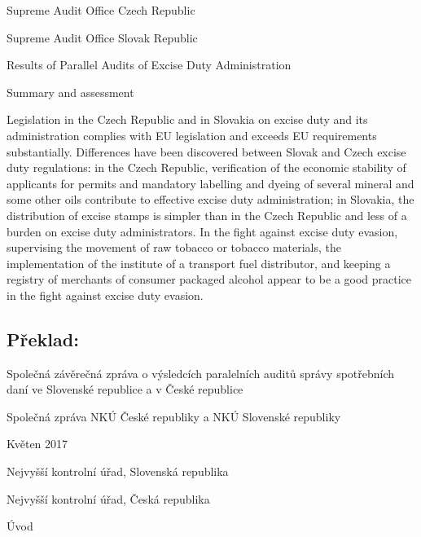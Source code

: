 \documentclass[10pt]{article}
\begin{document}
Supreme Audit Office Czech Republic



Supreme Audit Office Slovak Republic



Results of Parallel Audits of Excise Duty Administration



Summary and assessment

Legislation in the Czech Republic and in Slovakia on excise duty and its administration complies with EU legislation and exceeds EU requirements substantially.
Differences have been discovered between Slovak and Czech excise duty regulations: in the Czech Republic, verification of the economic stability of applicants for permits and mandatory labelling and dyeing of several mineral and some other oils contribute to effective excise duty administration; in Slovakia, the distribution of excise stamps is simpler than in the Czech Republic and less of a burden on excise duty administrators.
In the fight against excise duty evasion, supervising the movement of raw tobacco or tobacco materials, the implementation of the institute of a transport fuel distributor, and keeping a registry of merchants of consumer packaged alcohol appear to be a good practice in the fight against excise duty evasion.


\pagebreak

\subsection*{Překlad:}



Společná závěrečná zpráva o výsledcích paralelních auditů správy spotřebních daní ve Slovenské republice a v České republice



Společná zpráva NKÚ České republiky a NKÚ Slovenské republiky



Květen 2017



Nejvyšší kontrolní úřad, Slovenská republika



Nejvyšší kontrolní úřad, Česká republika



Úvod
\end{document}
